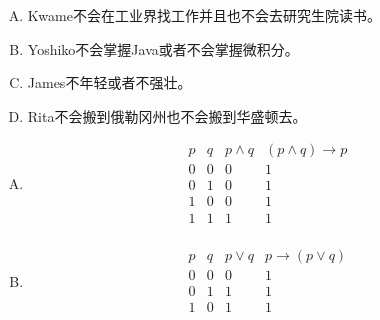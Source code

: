 {{        %
        \begin{practices}
            \begin{enumerate}[A.]
                \item Kwame不会在工业界找工作并且也不会去研究生院读书。
                \item Yoshiko不会掌握Java或者不会掌握微积分。
                \item James不年轻或者不强壮。
                \item Rita不会搬到俄勒冈州也不会搬到华盛顿去。
            \end{enumerate}
        \end{practices}

        \begin{practices}
            \begin{enumerate}[A.]
                \item
                {
                    \begin{table}[H]
                        \[
                            \begin{array}{c|c|c|c}
                                \hline
                                p & q & p \wedge q & (p \wedge q) \rightarrow p \\
                                \hline
                                0 & 0 & 0 & 1 \\
                                0 & 1 & 0 & 1 \\
                                1 & 0 & 0 & 1 \\
                                1 & 1 & 1 & 1 \\
                            \end{array}
                        \]
                    \end{table}
                }
                \item
                {
                    \begin{table}[H]
                        \[
                            \begin{array}{c|c|c|c}
                                \hline
                                p & q & p \vee q & p \rightarrow (p \vee q) \\
                                \hline
                                0 & 0 & 0 & 1 \\
                                0 & 1 & 1 & 1 \\
                                1 & 0 & 1 & 1 \\

\end{array}\]
\end{table}}
\end{enumerate}
\end{practices}}}
